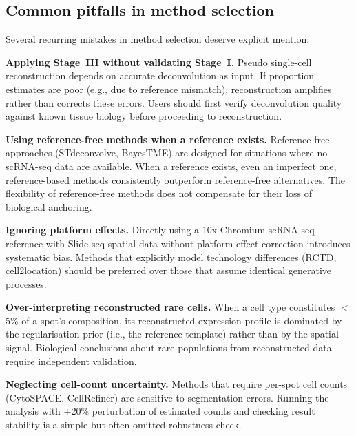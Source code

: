 \subsection{Common pitfalls in method selection}

Several recurring mistakes in method selection deserve explicit mention:

\textbf{Applying Stage~III without validating Stage~I.} Pseudo single-cell reconstruction depends on accurate deconvolution as input. If proportion estimates are poor (e.g., due to reference mismatch), reconstruction amplifies rather than corrects these errors. Users should first verify deconvolution quality against known tissue biology before proceeding to reconstruction.

\textbf{Using reference-free methods when a reference exists.} Reference-free approaches (STdeconvolve, BayesTME) are designed for situations where no scRNA-seq data are available. When a reference exists, even an imperfect one, reference-based methods consistently outperform reference-free alternatives. The flexibility of reference-free methods does not compensate for their loss of biological anchoring.

\textbf{Ignoring platform effects.} Directly using a 10x Chromium scRNA-seq reference with Slide-seq spatial data without platform-effect correction introduces systematic bias. Methods that explicitly model technology differences (RCTD, cell2location) should be preferred over those that assume identical generative processes.

\textbf{Over-interpreting reconstructed rare cells.} When a cell type constitutes $<$5\% of a spot's composition, its reconstructed expression profile is dominated by the regularisation prior (i.e., the reference template) rather than by the spatial signal. Biological conclusions about rare populations from reconstructed data require independent validation.

\textbf{Neglecting cell-count uncertainty.} Methods that require per-spot cell counts (CytoSPACE, CellRefiner) are sensitive to segmentation errors. Running the analysis with $\pm$20\% perturbation of estimated counts and checking result stability is a simple but often omitted robustness check.
